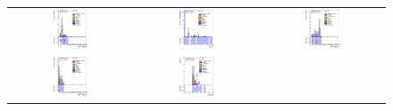 \begin{figure}[h!]
\begin{center}
\begin{tabular}{ccc}
%
\includegraphics[width=0.30\textwidth]{appendices/figures/sdrs/LepPt_ELEMUONCR7_1W_NOMINAL.eps} &
\includegraphics[width=0.30\textwidth]{appendices/figures/sdrs/LepEta_ELEMUONCR7_1W_NOMINAL.eps} &
\includegraphics[width=0.30\textwidth]{appendices/figures/sdrs/MET_ELEMUONCR7_1W_NOMINAL.eps} \\
\includegraphics[width=0.30\textwidth]{appendices/figures/sdrs/Wlep_MassT_ELEMUONCR7_1W_NOMINAL.eps} &
\includegraphics[width=0.30\textwidth]{appendices/figures/sdrs/Njets25_ELEMUONCR7_1W_NOMINAL.eps}  &

\end{tabular}
\end{center}
\end{figure}

